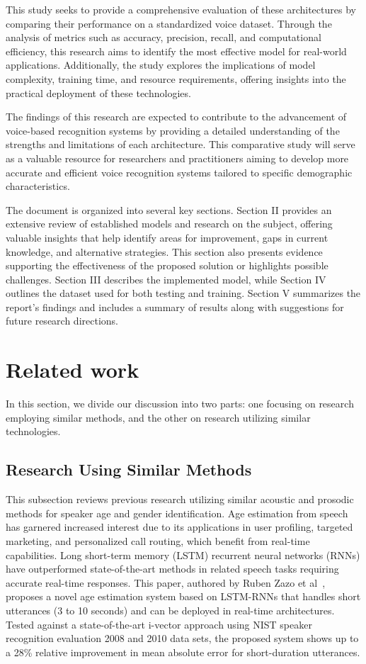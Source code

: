 \documentclass[conference, 10pt,onecolumn]{IEEEtran}
\begin{document}
This study seeks to provide a comprehensive evaluation of these architectures by comparing their performance on a standardized voice dataset. Through the analysis of metrics such as accuracy, precision, recall, and computational efficiency, this research aims to identify the most effective model for real-world applications. Additionally, the study explores the implications of model complexity, training time, and resource requirements, offering insights into the practical deployment of these technologies.

The findings of this research are expected to contribute to the advancement of voice-based recognition systems by providing a detailed understanding of the strengths and limitations of each architecture. This comparative study will serve as a valuable resource for researchers and practitioners aiming to develop more accurate and efficient voice recognition systems tailored to specific demographic characteristics.

The document is organized into several key sections. Section II provides an extensive review of established models and research on the subject, offering valuable insights that help identify areas for improvement, gaps in current knowledge, and alternative strategies. This section also presents evidence supporting the effectiveness of the proposed solution or highlights possible challenges. Section III describes the implemented model, while Section IV outlines the dataset used for both testing and training. Section V summarizes the report's findings and includes a summary of results along with suggestions for future research directions.

\section{Related work}
In this section, we divide our discussion into two parts: one focusing on research employing similar methods, and the other on research utilizing similar technologies.
\subsection{Research Using Similar Methods}
This subsection reviews previous research utilizing similar acoustic and prosodic methods for speaker age and gender identification. Age estimation from speech has garnered increased interest due to its applications in user profiling, targeted marketing, and personalized call routing, which benefit from real-time capabilities. Long short-term memory (LSTM) recurrent neural networks (RNNs) have outperformed state-of-the-art methods in related speech tasks requiring accurate real-time responses. This paper, authored by Ruben Zazo et al~\cite{zazo2018age}, proposes a novel age estimation system based on LSTM-RNNs that handles short utterances (3 to 10 seconds) and can be deployed in real-time architectures. Tested against a state-of-the-art i-vector approach using NIST speaker recognition evaluation 2008 and 2010 data sets, the proposed system shows up to a 28\% relative improvement in mean absolute error for short-duration utterances.
\end{document}
